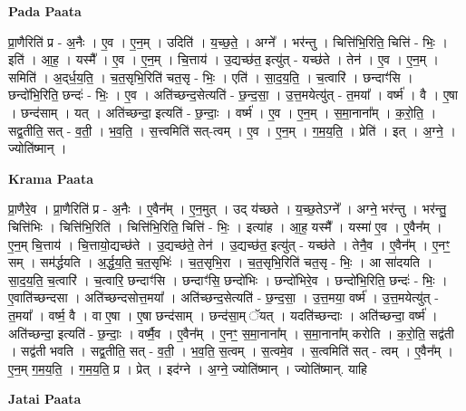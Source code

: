 \documentclass[17pt]{extarticle}
\begin{document}
\textbf{Pada Paata} \newline

प्रा॒णैरिति॑ प्र - अ॒नैः । ए॒व । ए॒न॒म् । उदिति॑ । य॒च्छ॒ते॒ । अग्ने᳚ । भर॑न्तु । चित्ति॑भि॒रिति॒ चित्ति॑ - भिः॒ । इति॑ । आ॒ह॒ । यस्मै᳚ । ए॒व । ए॒न॒म् । चि॒त्ताय॑ । उ॒द्यच्छ॑त॒ इत्यु॑त् - यच्छ॑ते । तेन॑ । ए॒व । ए॒न॒म् । समिति॑ । अ॒द्‌र्ध॒य॒ति॒ । च॒त॒सृभि॒रिति॑ चत॒सृ - भिः॒ । एति॑ । सा॒द॒य॒ति॒ । च॒त्वारि॑ । छन्दाꣳ॑सि । छन्दो॑भि॒रिति॒ छन्दः॑ - भिः॒ । ए॒व । अति॑च्छन्द॒सेत्यति॑ - छ॒न्द॒सा॒ । उ॒त्त॒मयेत्यु॑त् - त॒मया᳚ । वर्ष्म॑ । वै । ए॒षा । छन्द॑साम् । यत् । अति॑च्छन्दा॒ इत्यति॑ - छ॒न्दाः॒ । वर्ष्म॑ । ए॒व । ए॒न॒म् । स॒मा॒नाना᳚म् । क॒रो॒ति॒ । सद्व॒तीति॒ सत् - व॒ती॒ । भ॒व॒ति॒ । स॒त्त्वमिति॑ सत्-त्वम् । ए॒व । ए॒न॒म् । ग॒म॒य॒ति॒ । प्रेति॑ । इत् । अ॒ग्ने॒ । ज्योति॑ष्मान् ।  \newline


\textbf{Krama Paata} \newline

प्रा॒णैरे॒व । प्रा॒णैरिति॑ प्र - अ॒नैः । ए॒वैन᳚म् । ए॒न॒मुत् । उद् य॑च्छते । य॒च्छ॒तेऽग्ने᳚ । अग्ने॒ भर॑न्तु । भर॑न्तु॒ चित्ति॑भिः । चित्ति॑भि॒रिति॑ । चित्ति॑भि॒रिति॒ चित्ति॑ - भिः॒ । इत्या॑ह । आ॒ह॒ यस्मै᳚ । यस्मा॑ ए॒व । ए॒वैन᳚म् । ए॒न॒म् चि॒त्ताय॑ । चि॒त्तायो॒द्यच्छ॑ते । उ॒द्यच्छ॑ते॒ तेन॑ । उ॒द्यच्छ॑त॒ इत्यु॑त् - यच्छ॑ते । तेनै॒व । ए॒वैन᳚म् । ए॒नꣳ॒॒ सम् । सम॑र्द्धयति । अ॒र्द्ध॒य॒ति॒ च॒त॒सृभिः॑ । च॒त॒सृभि॒रा । च॒त॒सृभि॒रिति॑ चत॒सृ - भिः॒ । आ सा॑दयति । सा॒द॒य॒ति॒ च॒त्वारि॑ । च॒त्वारि॒ छन्दाꣳ॑सि । छन्दाꣳ॑सि॒ छन्दो॑भिः । छन्दो॑भिरे॒व । छन्दो॑भि॒रिति॒ छन्दः॑ - भिः॒ । ए॒वाति॑च्छन्दसा । अति॑च्छन्दसोत्त॒मया᳚ । अति॑च्छन्द॒सेत्यति॑ - छ॒न्द॒सा॒ । उ॒त्त॒मया॒ वर्ष्म॑ । उ॒त्त॒मयेत्यु॑त् - त॒मया᳚ । वर्ष्म॒ वै । वा ए॒षा । ए॒षा छन्द॑साम् । छन्द॑सा॒म् ॅयत् । यदति॑च्छन्दाः । अति॑च्छन्दा॒ वर्ष्म॑ । अति॑च्छन्दा॒ इत्यति॑ - छ॒न्दाः॒ । वर्ष्मै॒व । ए॒वैन᳚म् । ए॒नꣳ॒॒ स॒मा॒नाना᳚म् । स॒मा॒नाना᳚म् करोति । क॒रो॒ति॒ सद्व॑ती । सद्व॑ती भवति । सद्व॒तीति॒ सत् - व॒ती॒ । भ॒व॒ति॒ स॒त्वम् । स॒त्वमे॒व । स॒त्वमिति॑ सत् - त्वम् । ए॒वैन᳚म् । ए॒न॒म् ग॒म॒य॒ति॒ । ग॒म॒य॒ति॒ प्र । प्रेत् । इद॑ग्ने । अ॒ग्ने॒ ज्योति॑ष्मान् । ज्योति॑ष्मान्. याहि \newline

\textbf{Jatai Paata} \newline
\end{document}

